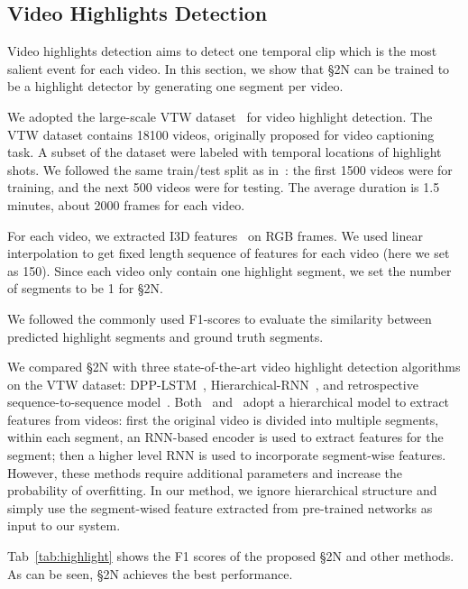 \documentclass[10pt,journal,compsoc]{IEEEtran}
\begin{document}
\subsection{Video Highlights Detection~\label{sec:video-highlight}}
Video highlights detection aims to detect one temporal clip which is the most salient event for each video. In this section, we show that \S2N can be trained to be a highlight detector by generating one segment per video.

 We adopted the large-scale VTW dataset~\cite{zeng2016generation} for video highlight detection. The VTW dataset contains 18100 videos, originally proposed for video captioning task. A subset of the dataset were labeled with temporal locations of highlight shots. We followed the same train/test split as in~\cite{zhang2018retrospective}: the first 1500 videos were for training, and the next 500 videos were for testing. The average duration is 1.5 minutes, about 2000 frames for each video.

For each video, we extracted I3D features~\cite{carreira2017quo} on RGB frames. We used linear interpolation to get fixed length sequence of features for each video (here we set as 150). Since each video only contain one highlight segment, we set the number of segments to be 1 for \S2N.

 We followed the commonly used F1-scores to evaluate the similarity between predicted highlight segments and ground truth segments. 

 We compared \S2N with three state-of-the-art video highlight detection algorithms on the VTW dataset: DPP-LSTM~\cite{zhang2016video}, Hierarchical-RNN~\cite{zhao2017hierarchical}, and retrospective sequence-to-sequence model~\cite{zhang2018retrospective}. Both~\cite{zhao2017hierarchical} and~\cite{zhang2018retrospective} adopt a hierarchical model to extract features from videos: first the original video is divided into multiple segments, within each segment, an RNN-based encoder is used to extract features for the segment; then a higher level RNN is used to incorporate segment-wise features. However, these methods require additional parameters and increase the probability of overfitting. In our method, we ignore hierarchical structure and simply use the segment-wised feature extracted from pre-trained networks as input to our system.

 Tab~\ref{tab:highlight} shows the F1 scores of the proposed \S2N and other methods. As can be seen, \S2N achieves the best performance. 
\end{document}

